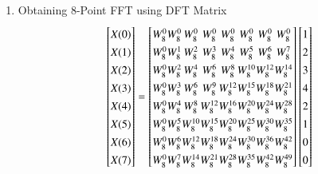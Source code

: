 \documentclass[journal,12pt,twocolumn]{IEEEtran}
\renewcommand\thesection{\arabic{section}}
\begin{document}
\begin{enumerate}[label=\thesection.\arabic*.,ref=\thesection.\theenumi]
\item Obtaining 8-Point FFT using DFT Matrix
\begin{equation}
\renewcommand{\arraystretch}{1.35}
\setlength\arraycolsep{0.05pt}
\begin{bmatrix}
X(0) \\
X(1) \\
X(2) \\
X(3) \\
X(4) \\
X(5) \\
X(6) \\
X(7)
\end{bmatrix}
=
\begin{bmatrix}
W^{0}_{8} & W^{0}_{8} & W^{0}_{8} & W^{0}_{8} & W^{0}_{8} & W^{0}_{8} & W^{0}_{8} & W^{0}_{8}\\
W^{0}_{8} & W^{1}_{8} & W^{2}_{8} & W^{3}_{8} & W^{4}_{8} & W^{5}_{8} & W^{6}_{8} & W^{7}_{8}\\
W^{0}_{8} & W^{2}_{8} & W^{4}_{8} & W^{6}_{8} & W^{8}_{8} & W^{10}_{8} & W^{12}_{8} & W^{14}_{8}\\
W^{0}_{8} & W^{3}_{8} & W^{6}_{8} & W^{9}_{8} & W^{12}_{8} & W^{15}_{8} & W^{18}_{8} & W^{21}_{8}\\
W^{0}_{8} & W^{4}_{8} & W^{8}_{8} & W^{12}_{8} & W^{16}_{8} & W^{20}_{8} & W^{24}_{8} & W^{28}_{8}\\
W^{0}_{8} & W^{5}_{8} & W^{10}_{8} & W^{15}_{8} & W^{20}_{8} & W^{25}_{8} & W^{30}_{8} & W^{35}_{8}\\
W^{0}_{8} & W^{6}_{8} & W^{12}_{8} & W^{18}_{8} & W^{24}_{8} & W^{30}_{8} & W^{36}_{8} & W^{42}_{8}\\
W^{0}_{8} & W^{7}_{8} & W^{14}_{8} & W^{21}_{8} & W^{28}_{8} & W^{35}_{8} & W^{42}_{8} & W^{49}_{8}
\end{bmatrix}
\begin{bmatrix}
1 \\
2 \\
3 \\
4 \\
2 \\
1 \\
0 \\
0
\end{bmatrix}
\end{equation}


\end{enumerate}
\end{document}
